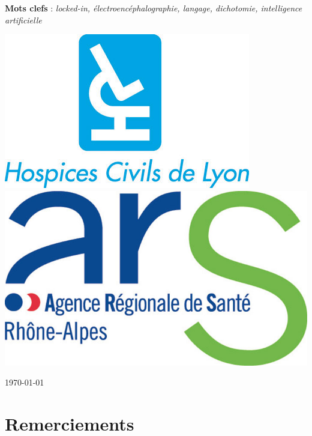 \documentclass[11pt,a4paper]{article}
\theoremstyle{plain}
\theoremstyle{definition}
\begin{document}
\begin{center}
{} %


\vspace{0.5cm}

\parbox{15cm}{
\textbf{Mots clefs} : \it locked-in, électroencéphalographie, langage, dichotomie, intelligence artificielle
} %

\vspace{1.5cm}

\parbox{15cm}{

\includegraphics[scale=0.24]{images/logo-hcl-plein_2995-bleu.jpg} \hfill
\includegraphics[scale=0.15]{images/ARS-Auvergne-Rhone-Alpes.jpg}
} %

\vspace{0.5cm}
\vspace{0.5cm}
\end{center}

\vfill
\hfill \today
\newpage
\thispagestyle{empty}
\section*{Remerciements}
\end{document}
